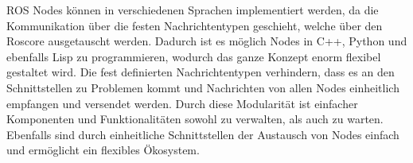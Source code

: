 \newline
ROS Nodes können in verschiedenen Sprachen implementiert werden, da die Kommunikation über die festen Nachrichtentypen geschieht, welche über den Roscore ausgetauscht werden. Dadurch ist es möglich Nodes in C++, Python und ebenfalls Lisp zu programmieren, wodurch das ganze Konzept enorm flexibel gestaltet wird. Die fest definierten Nachrichtentypen verhindern, dass es an den Schnittstellen zu Problemen kommt und Nachrichten von allen Nodes einheitlich empfangen und versendet werden. \newline
Durch diese Modularität ist einfacher Komponenten und Funktionalitäten sowohl zu verwalten, als auch zu warten. Ebenfalls sind durch einheitliche Schnittstellen der Austausch von Nodes einfach und ermöglicht ein flexibles Ökosystem.



